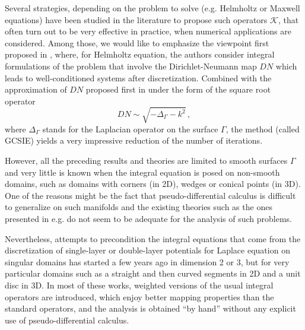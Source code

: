 \documentclass[a4paper]{article}
\begin{document}
Several strategies, depending on the problem to solve (e.g. Helmholtz or Maxwell equations) have been studied in the literature to propose such 
operators $\mathcal{K}$, that often turn out to be very effective in practice, when numerical applications are considered. Among those, we would 
like to emphasize the viewpoint first proposed in \cite{alouges2005new,alouges2007stable}, where, for Helmholtz equation, the authors consider 
integral formulations of the problem that involve the Dirichlet-Neumann map $DN$ which leads to well-conditioned systems after discretization. 
Combined with the approximation of $DN$ proposed first in \cite{antoine2007generalized} under the form of the square root operator
\begin{equation}
DN \sim \sqrt{-\Delta_\Gamma -k^2}\,,
\end{equation}
where $\Delta_\Gamma$ stands for the Laplacian operator on the surface $\Gamma$, the method (called GCSIE) yields a very impressive 
reduction of the number of iterations. 

However, all the preceding results and theories are limited to smooth surfaces $\Gamma$ and very little is known when the integral equation 
is posed on non-smooth domains, such as domains with corners (in 2D), wedges or conical points (in 3D). One of the reasons might be the 
fact that pseudo-differential calculus is difficult to generalize on such manifolds and the existing theories such as the ones presented in e.g. 
\cite{melrose,schulze1,schulze2} do not seem to be adequate for the analysis of such problems.

Nevertheless, attempts to precondition the integral equations that come from the discretization of single-layer or double-layer potentials 
for Laplace equation on singular domains has started a few years ago \cite{bruno2012second,hiptmair2017closed,jerez2012explicit,
hiptmair2014mesh,ramaciotti2017some} in dimension 2 or 3, but for very particular domains such as a straight and then curved segments 
in 2D and a unit disc in 3D. In most of these works, weighted versions of the usual integral operators are introduced, which enjoy better 
mapping properties than the standard operators, and the analysis is obtained ``by hand'' without any explicit use of pseudo-differential calculus. 
\end{document}

